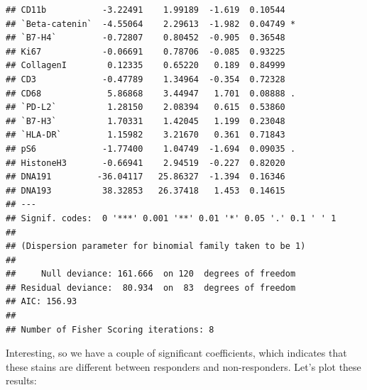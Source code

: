 \documentclass[a4paper]{article}\usepackage[]{graphicx}\usepackage[]{color}
\makeatletter
\newenvironment{kframe}{%
 \def\at@end@of@kframe{}%
 \ifinner\ifhmode%
  \def\at@end@of@kframe{\end{minipage}}%
  \begin{minipage}{\columnwidth}%
 \fi\fi%
 \def\FrameCommand##1{\hskip\@totalleftmargin \hskip-\fboxsep
 \colorbox{shadecolor}{##1}\hskip-\fboxsep
     \hskip-\linewidth \hskip-\@totalleftmargin \hskip\columnwidth}%
 \MakeFramed {\advance\hsize-\width
   \@totalleftmargin\z@ \linewidth\hsize
   \@setminipage}}%
 {\par\unskip\endMakeFramed%
 \at@end@of@kframe}
\newenvironment{knitrout}{}{} %
\makeatother
\begin{document}
\begin{knitrout}
\begin{kframe}
\begin{verbatim}
## CD11b           -3.22491    1.99189  -1.619  0.10544   
## `Beta-catenin`  -4.55064    2.29613  -1.982  0.04749 * 
## `B7-H4`         -0.72807    0.80452  -0.905  0.36548   
## Ki67            -0.06691    0.78706  -0.085  0.93225   
## CollagenI        0.12335    0.65220   0.189  0.84999   
## CD3             -0.47789    1.34964  -0.354  0.72328   
## CD68             5.86868    3.44947   1.701  0.08888 . 
## `PD-L2`          1.28150    2.08394   0.615  0.53860   
## `B7-H3`          1.70331    1.42045   1.199  0.23048   
## `HLA-DR`         1.15982    3.21670   0.361  0.71843   
## pS6             -1.77400    1.04749  -1.694  0.09035 . 
## HistoneH3       -0.66941    2.94519  -0.227  0.82020   
## DNA191         -36.04117   25.86327  -1.394  0.16346   
## DNA193          38.32853   26.37418   1.453  0.14615   
## ---
## Signif. codes:  0 '***' 0.001 '**' 0.01 '*' 0.05 '.' 0.1 ' ' 1
## 
## (Dispersion parameter for binomial family taken to be 1)
## 
##     Null deviance: 161.666  on 120  degrees of freedom
## Residual deviance:  80.934  on  83  degrees of freedom
## AIC: 156.93
## 
## Number of Fisher Scoring iterations: 8
\end{verbatim}
\end{kframe}
\end{knitrout}

Interesting, so we have a couple of significant coefficients, which indicates that these stains are different between responders and non-responders. Let's plot these results:
\end{document}
